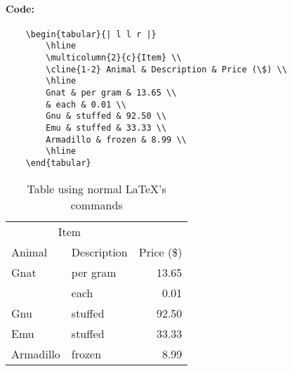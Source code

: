 \paragraph{Code:}
\begin{verbatim}
	\begin{tabular}{| l l r |}
		\hline
		\multicolumn{2}{c}{Item} \\
		\cline{1-2} Animal & Description & Price (\$) \\
		\hline
		Gnat & per gram & 13.65 \\
		& each & 0.01 \\
		Gnu & stuffed & 92.50 \\
		Emu & stuffed & 33.33 \\
		Armadillo & frozen & 8.99 \\
		\hline
	\end{tabular}
\end{verbatim}

\begin{table}[htbp]
	\centering
	\begin{tabular}{| l l r |}
		\hline
		\multicolumn{2}{c}{Item} \\
		\cline{1-2} Animal & Description & Price (\$) \\
		\hline
		Gnat & per gram & 13.65 \\
		& each & 0.01 \\
		Gnu & stuffed & 92.50 \\
		Emu & stuffed & 33.33 \\
		Armadillo & frozen & 8.99 \\
		\hline
	\end{tabular}
	\caption{Table using normal \LaTeX{}'s commands}
	\label{nomarllatex}
\end{table}
